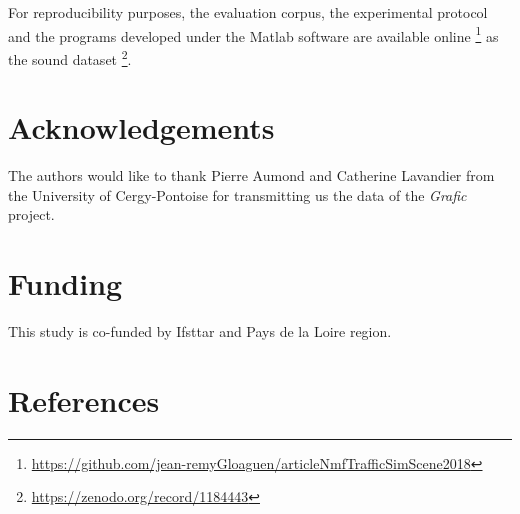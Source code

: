 \documentclass[review,5p,twocolumn,sort&compress,times]{elsarticle}
\begin{document}
For reproducibility purposes, the evaluation corpus, the experimental protocol and the programs developed under the Matlab software are available online \footnote{\url{https://github.com/jean-remyGloaguen/articleNmfTrafficSimScene2018}} as the sound dataset \footnote{\url{https://zenodo.org/record/1184443}}. 

\section*{Acknowledgements}
The authors would like to thank Pierre Aumond and Catherine Lavandier from the University of Cergy-Pontoise for transmitting us the data of the \textit{Grafic} project.

\section*{Funding}
This study is co-funded by Ifsttar and Pays de la Loire region.

\section*{References}


\end{document}
